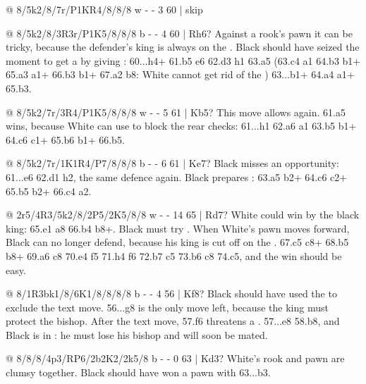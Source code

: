 @ 8/5k2/8/7r/P1KR4/8/8/8 w - - 3 60 | skip

@ 8/5k2/8/3R3r/P1K5/8/8/8 b - - 4 60 | Rh6?
Against a rook's pawn it can be tricky, because the defender's king is always on the
. Black should have seized the moment to get a
by giving : 60...\R h4+ 61.\K b5 \K e6 62.\R d3
\R h1 63.a5 (63.\K c4 \R a1 64.\K b3 \R b1+ 65.\K a3 \R a1+ 66.\K b3 \R b1+ 67.\K a2 \R b8: White
cannot get rid of the ) 63...\R b1+ 64.\K a4 \R a1+
65.\K b3.

@ 8/5k2/7r/3R4/P1K5/8/8/8 w - - 5 61 | Kb5?
This move allows  again. 61.a5 wins, because
White can use  to block the rear checks: 61...\R h1
62.a6 \R a1 63.\K b5 \R b1+ 64.\K c6 \R c1+ 65.\K b6 \R b1+ 66.\R b5.

@ 8/5k2/7r/1K1R4/P7/8/8/8 b - - 6 61 | Ke7?
Black misses an opportunity: 61...\K e6 62.\R d1 \R h2, the same defence again. Black prepares
: 63.a5 \R b2+ 64.\K c6 \R c2+ 65.\K b5 \R b2+
66.\K c4 \R a2.

@ 2r5/4R3/5k2/8/2P5/2K5/8/8 w - - 14 65 | Rd7?
White could win by  the black king: 65.\R e1 \R a8 66.\K b4
\R b8+. Black must try . When White's pawn moves forward, Black can no
longer defend, because his king is cut off on the .
67.\K c5 \R c8+ 68.\K b5 \R b8+ 69.\K a6 \R c8 70.\R e4 \K f5 71.\R h4 \K f6 72.\K b7 \R c5
73.\K b6 \R c8 74.c5, and the win should be easy.

@ 8/1R3bk1/8/6K1/8/8/8/8 b - - 4 56 | Kf8?
Black should have used the 
to exclude the text move. 56...\K g8 is the only move left, because the king must protect the
bishop. After the text move, 57.\K f6 threatens a
. 57...\B e8 58.\R b8, and Black
is in : he must lose his bishop and will soon be mated.

@ 8/8/8/4p3/RP6/2b2K2/2k5/8 b - - 0 63 | Kd3?
White's rook and pawn are clumsy together. Black should have won a pawn with 63...\K b3.

